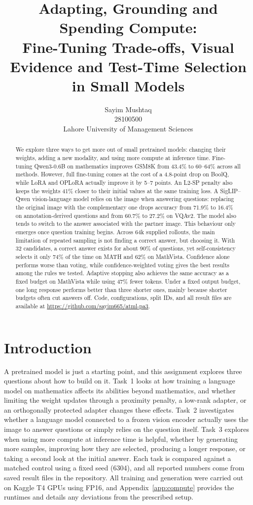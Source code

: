 \documentclass{article}
\title{Adapting, Grounding and Spending Compute:\\Fine-Tuning Trade-offs, Visual Evidence and Test-Time Selection in Small Models}
\author{
  Sayim Mushtaq \\
  28100500 \\
  Lahore University of Management Sciences \\
}
\begin{document}
\maketitle

\begin{abstract}
We explore three ways to get more out of small pretrained models: changing their weights, adding a new modality, and using more compute at inference time. Fine-tuning Qwen3-0.6B on mathematics improves GSM8K from 43.4\% to 60--64\% across all methods. However, full fine-tuning comes at the cost of a 4.8-point drop on BoolQ, while LoRA and OPLoRA actually improve it by 5--7 points. An L2-SP penalty also keeps the weights 41\% closer to their initial values at the same training loss. A SigLIP--Qwen vision-language model relies on the image when answering questions: replacing the original image with the complementary one drops accuracy from 71.9\% to 16.4\% on annotation-derived questions and from 60.7\% to 27.2\% on VQAv2. The model also tends to switch to the answer associated with the partner image. This behaviour only emerges once question training begins. Across 64k supplied rollouts, the main limitation of repeated sampling is not finding a correct answer, but choosing it. With 32 candidates, a correct answer exists for about 90\% of questions, yet self-consistency selects it only 74\% of the time on MATH and 62\% on MathVista. Confidence alone performs worse than voting, while confidence-weighted voting gives the best results among the rules we tested. Adaptive stopping also achieves the same accuracy as a fixed budget on MathVista while using 47\% fewer tokens. Under a fixed output budget, one long response performs better than three shorter ones, mainly because shorter budgets often cut answers off. Code, configurations, split IDs, and all result files are available at \url{https://github.com/sayim665/atml-pa3}.
\end{abstract}

\section{Introduction}

A pretrained model is just a starting point, and this assignment explores three questions about how to build on it. Task~1 looks at how training a language model on mathematics affects its abilities beyond mathematics, and whether limiting the weight updates through a proximity penalty, a low-rank adapter, or an orthogonally protected adapter changes these effects. Task~2 investigates whether a language model connected to a frozen vision encoder actually uses the image to answer questions or simply relies on the question itself. Task~3 explores when using more compute at inference time is helpful, whether by generating more samples, improving how they are selected, producing a longer response, or taking a second look at the initial answer. Each task is compared against a matched control using a fixed seed (6304), and all reported numbers come from saved result files in the repository. All training and generation were carried out on Kaggle T4 GPUs using FP16, and Appendix~\ref{app:compute} provides the runtimes and details any deviations from the prescribed setup.
\end{document}
